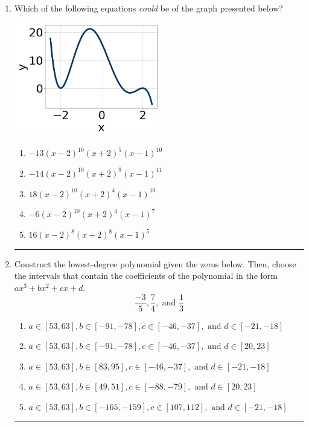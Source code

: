 \documentclass[14pt]{extbook}
\newcommand{\litem}[1]{\item#1\hspace*{-1cm}\rule{\textwidth}{0.4pt}}
\begin{document}
\begin{enumerate}
\litem{
Which of the following equations \textit{could} be of the graph presented below?
\begin{center}
    \includegraphics[width=0.5\textwidth]{../Figures/polyGraphToFunctionC.png}
\end{center}
\begin{enumerate}[label=\Alph*.]
\item \( -13(x - 2)^{10} (x + 2)^{5} (x - 1)^{10} \)
\item \( -14(x - 2)^{10} (x + 2)^{9} (x - 1)^{11} \)
\item \( 18(x - 2)^{10} (x + 2)^{4} (x - 1)^{10} \)
\item \( -6(x - 2)^{10} (x + 2)^{4} (x - 1)^{7} \)
\item \( 16(x - 2)^{8} (x + 2)^{8} (x - 1)^{5} \)

\end{enumerate} }
\litem{
Construct the lowest-degree polynomial given the zeros below. Then, choose the intervals that contain the coefficients of the polynomial in the form $ax^3+bx^2+cx+d$.\[ \frac{-3}{5}, \frac{7}{4}, \text{ and } \frac{1}{3} \]\begin{enumerate}[label=\Alph*.]
\item \( a \in [53, 63], b \in [-91, -78], c \in [-46, -37], \text{ and } d \in [-21, -18] \)
\item \( a \in [53, 63], b \in [-91, -78], c \in [-46, -37], \text{ and } d \in [20, 23] \)
\item \( a \in [53, 63], b \in [83, 95], c \in [-46, -37], \text{ and } d \in [-21, -18] \)
\item \( a \in [53, 63], b \in [49, 51], c \in [-88, -79], \text{ and } d \in [20, 23] \)
\item \( a \in [53, 63], b \in [-165, -159], c \in [107, 112], \text{ and } d \in [-21, -18] \)


\end{enumerate}}
\end{enumerate}
\end{document}
